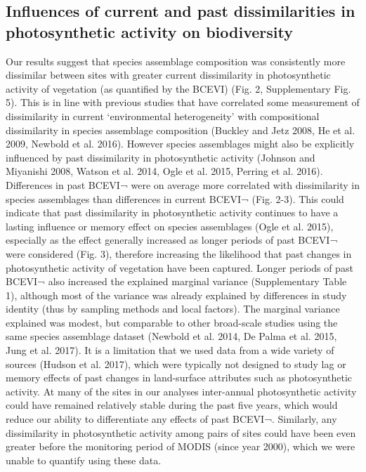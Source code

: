 {\subsection{Influences of current and past dissimilarities in photosynthetic activity on biodiversity}
Our results suggest that species assemblage composition was consistently more dissimilar between sites with greater current dissimilarity in photosynthetic activity of vegetation (as quantified by the BCEVI) (Fig. 2, Supplementary Fig. 5). This is in line with previous studies that have correlated some measurement of dissimilarity in current ‘environmental heterogeneity’ with compositional dissimilarity in species assemblage composition (Buckley and Jetz 2008, He et al. 2009, Newbold et al. 2016). However species assemblages might also be explicitly influenced by past dissimilarity in photosynthetic activity (Johnson and Miyanishi 2008, Watson et al. 2014, Ogle et al. 2015, Perring et al. 2016). 
	Differences in past BCEVI¬ were on average more correlated with dissimilarity in species assemblages than differences in current BCEVI¬ (Fig. 2-3). This could indicate that past dissimilarity in photosynthetic activity continues to have a lasting influence or memory effect on species assemblages (Ogle et al. 2015), especially as the effect generally increased as longer periods of past BCEVI¬ were considered (Fig. 3), therefore increasing the likelihood that past changes in photosynthetic activity of vegetation have been captured. Longer periods of past BCEVI¬ also increased the explained marginal variance (Supplementary Table 1), although most of the variance was already explained by differences in study identity (thus by sampling methods and local factors). The marginal variance explained was modest, but comparable to other broad-scale studies using the same species assemblage dataset (Newbold et al. 2014, De Palma et al. 2015, Jung et al. 2017). It is a limitation that we used data from a wide variety of sources (Hudson et al. 2017), which were typically not designed to study lag or memory effects of past changes in land-surface attributes such as photosynthetic activity. At many of the sites in our analyses inter-annual photosynthetic activity could have remained relatively stable during the past five years, which would reduce our ability to differentiate any effects of past BCEVI¬. Similarly, any dissimilarity in photosynthetic activity among pairs of sites could have been even greater before the monitoring period of MODIS (since year 2000), which we were unable to quantify using these data. 
}

